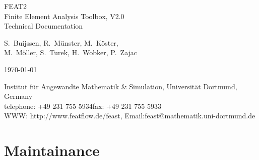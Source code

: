 \documentclass[10pt,a4paper]{report}
\begin{document}
\begin{titlepage}

\vspace*{4cm}

\begin{center}

{\Huge FEAT2}\\[2cm] 
{\huge Finite Element Analysis Toolbox, V2.0}\\[0.5cm] 

{\LARGE Technical Documentation}\\[3cm]

\vspace*{0.5cm}

{\large
 S.~Buijssen, R.~M\"unster, M.~K\"oster, \\[1em]
 M.~M\"oller, S.~Turek, H.~Wobker, P.~Zajac}

\vspace*{2cm}

\today

\vspace*{2cm}

Institut f{\"u}r Angewandte Mathematik \& Simulation, Universit{\"a}t Dortmund, Germany \\[0.5em]
telephone: +49 231 755 5934\qquad fax: +49 231 755 5933 \\[0.5em]
WWW: http://www.featflow.de/feast, Email:feast@mathematik.uni-dortmund.de

\end{center}

\end{titlepage}


\tableofcontents


\chapter{Maintainance}





%


%

%


%

\nocite{Turek1997c,Turek1998}

\end{document}
